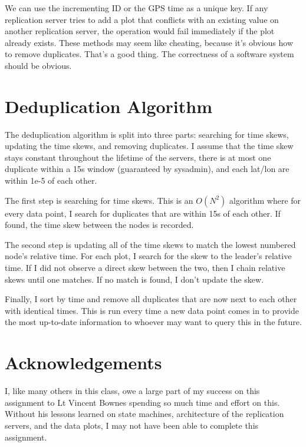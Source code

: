 \documentclass{article}
\begin{document}
\begin{multicols*}{2}
We can use the incrementing ID or the GPS time as a unique key.  If any replication server tries to add a plot that conflicts with an existing value on another replication server, the operation would fail immediately if the plot already exists.  These methods may seem like cheating, because it's obvious how to remove duplicates.  That's a good thing.  The correctness of a software system should be obvious.

\section{Deduplication Algorithm}
The deduplication algorithm is split into three parts: searching for time skews, updating the time skews, and removing duplicates.  I assume that the time skew stays constant throughout the lifetime of the servers, there is at most one duplicate within a 15s window (guaranteed by sysadmin), and each lat/lon are within 1e-5 of each other.

The first step is searching for time skews.  This is an $O(N^2)$ algorithm where for every data point, I search for duplicates that are within 15s of each other.  If found, the time skew between the nodes is recorded.

The second step is updating all of the time skews to match the lowest numbered node's relative time.  For each plot, I search for the skew to the leader's relative time.  If I did not observe a direct skew between the two, then I chain relative skews until one matches.  If no match is found, I don't update the skew.

Finally, I sort by time and remove all duplicates that are now next to each other with identical times.  This is run every time a new data point comes in to provide the most up-to-date information to whoever may want to query this in the future.

\section{Acknowledgements}
I, like many others in this class, owe a large part of my success on this assignment to Lt Vincent Bownes spending so much time and effort on this.  Without his lessons learned on state machines, architecture of the replication servers, and the data plots, I may not have been able to complete this assignment.

\end{multicols*}
\end{document}
